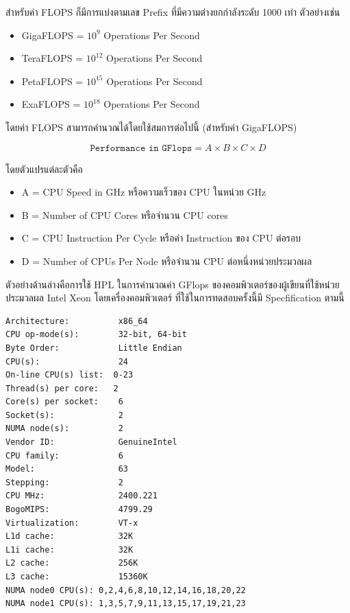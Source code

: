 สำหรับค่า FLOPS ก็มีการแบ่งตามเลข Prefix ที่มีความต่างยกกำลังระดับ 1000 เท่า ตัวอย่างเช่น

\begin{itemize}[topsep=0pt,noitemsep]
  \setlength\itemsep{1em}
  \item GigaFLOPS = $10^{9}$ Operations Per Second

  \item TeraFLOPS = $10^{12}$ Operations Per Second

  \item PetaFLOPS = $10^{15}$ Operations Per Second

  \item ExaFLOPS = $10^{18}$ Operations Per Second
\end{itemize}

\noindent โดยค่า FLOPS สามารถคำนวณได้โดยใช้สมการต่อไปนี้ (สำหรับค่า GigaFLOPS)

\begin{equation}
  \texttt{Performance in GFlops} = A \times B \times C \times D
\end{equation}

\noindent โดยตัวแปรแต่ละตัวคือ

\begin{itemize}[topsep=0pt,noitemsep]
  \setlength\itemsep{1em}
  \item A = CPU Speed in GHz หรือความเร็วของ CPU ในหน่วย GHz

  \item B = Number of CPU Cores หรือจำนวน CPU cores

  \item C = CPU Instruction Per Cycle หรือค่า Instruction ของ CPU ต่อรอบ

  \item D = Number of CPUs Per Node หรือจำนวน CPU ต่อหนึ่งหน่วยประมวลผล
\end{itemize}

ตัวอย่างด้านล่างคือการใช้ HPL ในการคำนวณค่า GFlops ของคอมพิวเตอร์ของผู้เขียนที่ใช้หน่วยประมวลผล Intel Xeon โดยเครื่องคอมพิวเตอร์%
ที่ใช้ในการทดสอบครั้งนี้มี Specfification ตามนี้

\begin{lstlisting}[basicstyle=\ttfamily\footnotesize\linespread{0.5}]
Architecture:          x86_64
CPU op-mode(s):        32-bit, 64-bit
Byte Order:            Little Endian
CPU(s):                24
On-line CPU(s) list:  0-23
Thread(s) per core:   2
Core(s) per socket:    6
Socket(s):             2
NUMA node(s):          2
Vendor ID:             GenuineIntel
CPU family:            6
Model:                 63
Stepping:              2
CPU MHz:               2400.221
BogoMIPS:              4799.29
Virtualization:        VT-x
L1d cache:             32K
L1i cache:             32K
L2 cache:              256K
L3 cache:              15360K
NUMA node0 CPU(s): 0,2,4,6,8,10,12,14,16,18,20,22
NUMA node1 CPU(s): 1,3,5,7,9,11,13,15,17,19,21,23
\end{lstlisting}

